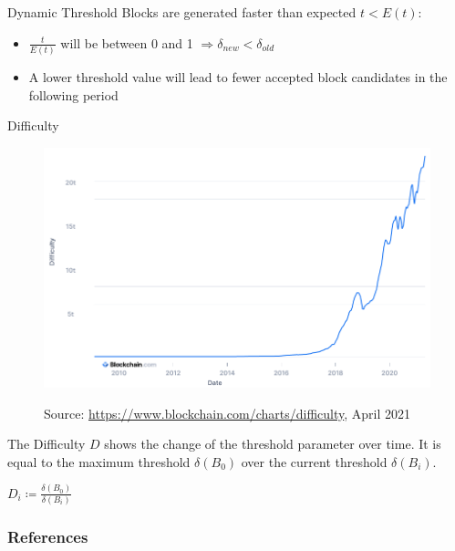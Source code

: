\documentclass[]{beamer}
\begin{document}
\begin{frame}{Dynamic Threshold}
	Blocks are generated faster than expected $t < E(t)$:
	\begin{itemize}
		\item $\frac{t}{E(t)}$ will be between 0 and 1 $\Rightarrow \delta_{new} < \delta_{old}$
		\item A lower threshold value will lead to fewer accepted block candidates in the following period
	\end{itemize}


\end{frame}

\begin{frame}{Difficulty}
	\begin{figure}[t]
		\includegraphics[height=\textheight/2]{../assets/images/difficulty}
		
		\tiny Source: \link \url{https://www.blockchain.com/charts/difficulty}, April 2021
	\end{figure}
	
	
	
	The Difficulty $D$ shows the change of the threshold parameter over time. It is equal to the maximum threshold $\delta(B_0)$ over the current threshold $\delta(B_i)$.
	\begin{center}
		$D_i \coloneqq \frac{\delta(B_0)}{\delta(B_i)}$
	\end{center}
\end{frame}

\begin{frame}%
	\frametitle{References}
	
	
\end{frame}
\end{document}
